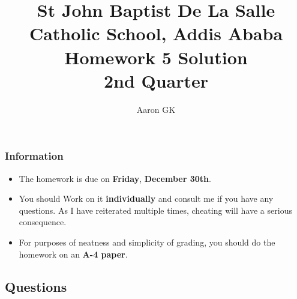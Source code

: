 \documentclass[9pt,addpoints]{exam}
\author{Aaron GK}
\begin{document}
	\title{St John Baptist De La Salle Catholic School, Addis Ababa\\
		\large Homework 5 Solution\\
		2nd Quarter}
	\maketitle
	\begin{center}
		\subsubsection*{Information}
		\begin{itemize}
			\item The homework is due on \textbf{Friday}, \textbf{December 30th}.
			\item You should Work on it \textbf{individually} and consult me if you have any questions. As I have reiterated multiple times, cheating will have a serious consequence.
			\item For purposes of neatness and simplicity of grading, you should do the homework on an \textbf{A-4 paper}.
		\end{itemize}
	\end{center}
	\begin{center}
		\subsection*{Questions}
	\end{center}
	
\end{document}
